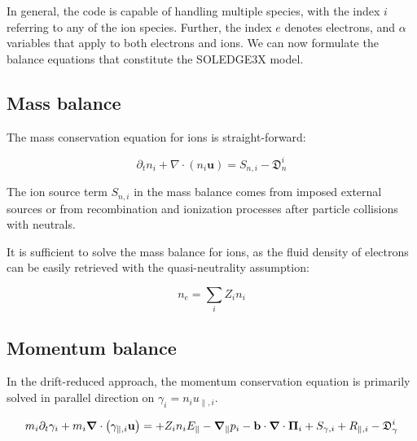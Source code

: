 In general, the code is capable of handling multiple species, with the index $i$ referring to any of the ion species. Further, the index $e$ denotes electrons, and $\alpha$ variables that apply to both electrons and ions. We can now formulate the balance equations that constitute the SOLEDGE3X model.



\subsection{Mass balance}

The mass conservation equation for ions is straight-forward:

\begin{equation}
	\partial_t n_i + \nabla\cdot\left(n_i\mathbf{u}\right) = S_{n,i} - \mathfrak{D}_n^i
\end{equation}

The ion source term $S_{n,i}$ in the mass balance comes from imposed external sources or from recombination and ionization processes after particle collisions with neutrals. 


It is sufficient to solve the mass balance for ions, as the fluid density of electrons can be easily retrieved with the quasi-neutrality assumption:

\begin{equation}
	n_e = \sum_{i}Z_i n_i
\end{equation}

\subsection{Momentum balance}

In the drift-reduced approach, the momentum  conservation equation is primarily solved in parallel direction on $\gamma_i = n_iu_{\parallel,i}$.

\begin{equation}
	m_i\partial_t \gamma_{i} + m_i\grad\cdot\left(\gamma_{\parallel,i}\mathbf{u}\right) = + Z_in_iE_\parallel -\grad_\parallel{p_i} - \mathbf{b}\cdot\grad\cdot\boldsymbol{\Pi}_i + S_{\gamma,i} + R_{\parallel,i} - \mathfrak{D}_\gamma^i
\end{equation}


